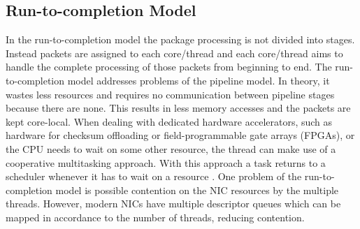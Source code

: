\subsection{Run-to-completion Model}
In the run-to-completion model the package processing is not divided into stages. Instead packets are assigned to each core/thread and each core/thread aims to handle the complete processing of those packets from beginning to end. The run-to-completion model addresses problems of the pipeline model. In theory, it wastes less resources and requires no communication between pipeline stages because there are none. This results in less memory accesses and the packets are kept core-local. \newline
When dealing with dedicated hardware accelerators, such as hardware for checksum offloading or field-programmable gate arrays (FPGAs), or the CPU needs to wait on some other resource, the thread can make use of a cooperative multitasking approach. With this approach a task returns to a scheduler whenever it has to wait on a resource \cite{intel:packet}. One problem of the run-to-completion model is possible contention on the NIC resources by the multiple threads. However, modern NICs have multiple descriptor queues which can be mapped in accordance to the number of threads, reducing contention.

